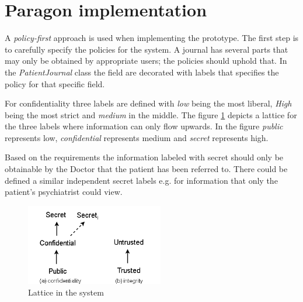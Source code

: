 





\section{Paragon implementation}

A \emph{policy-first} approach is used when implementing the prototype. The first step is to carefully specify the policies for the system. A journal has several parts that may only be obtained by appropriate users; the policies should uphold that. In the \emph{PatientJournal} class the field are decorated with labels that specifies the policy for that specific field. 

For confidentiality three labels are defined with \emph{low} being the most liberal, \emph{High} being the most strict and \emph{medium} in the middle. The figure \ref{fig:lattice_confidentiality} depicts a lattice for the three labels where information can only flow upwards. In the figure \emph{public} represents low, \emph{confidential} represents medium and \emph{secret} represents high. 

Based on the requirements the information labeled with secret should only be obtainable by the Doctor that the patient has been referred to. There could be defined a similar independent secret labels e.g. for information that only the patient's psychiatrist could view.  


\begin{figure}[H] 
	\centering
	\includegraphics[width=6cm]{figures/lattice_confidentiality.png}
	\caption{Lattice in the system}
	\label{fig:lattice_confidentiality}
\end{figure}

